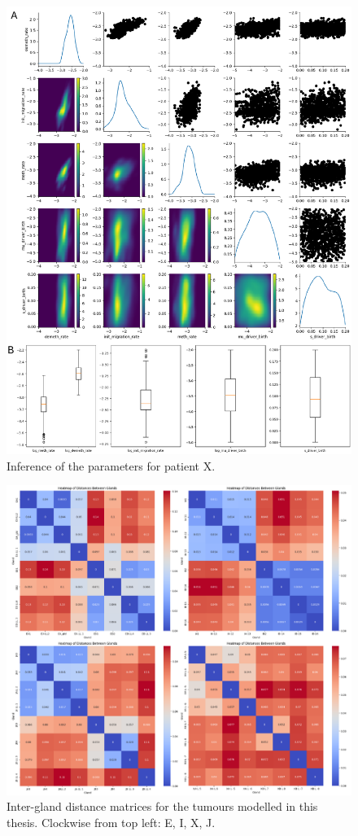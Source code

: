 \begin{figure}[h]
\centering
\includegraphics[width=\textwidth]{Chapter_5/figures/inference_X.pdf}
\caption{Inference of the parameters for patient X.}
\label{fig:inference_X}
\end{figure}

\begin{figure}[ht]
\centering
\includegraphics[width=\textwidth]{Chapter_5/figures/gland_dists.pdf}
\caption{Inter-gland distance matrices for the tumours modelled in this thesis.
    Clockwise from top left: E, I, X, J.}
\label{fig:gland_dists}
\end{figure}
